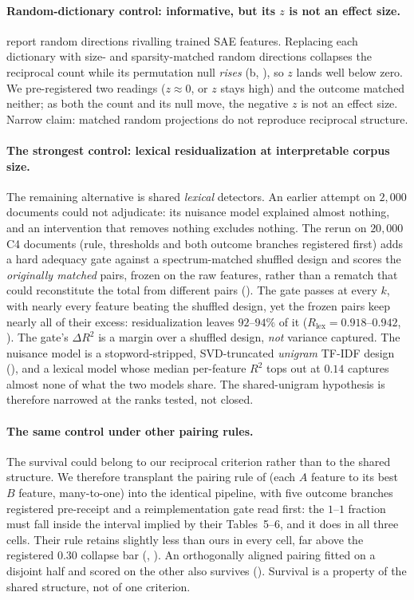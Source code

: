 \paragraph{Random-dictionary control: informative, but its $z$ is not an effect size.}
\citet{korznikov2026sanity} report random directions rivalling trained SAE features. Replacing
each dictionary with size- and sparsity-matched random directions collapses the reciprocal count
while its permutation null \emph{rises} (b, ), so $z$ lands
well below zero. We pre-registered two readings ($z\approx0$, or $z$ stays high) and the
outcome matched neither; as both the count and its null move, the negative $z$ is not an
effect size. Narrow claim: matched random projections do not reproduce reciprocal structure.

\paragraph{The strongest control: lexical residualization at interpretable corpus
size.} The remaining alternative is shared \emph{lexical} detectors. An earlier attempt on
$2{,}000$ documents could not adjudicate: its nuisance model explained almost nothing, and an
intervention that removes nothing excludes nothing. The rerun on $20{,}000$ C4 documents
(rule, thresholds and both outcome branches registered first) adds a hard adequacy gate against a
spectrum-matched shuffled design and scores the \emph{originally matched} pairs, frozen on the raw
features, rather than a rematch that could reconstitute the total from different pairs
(). The gate passes at every $k$, with nearly every feature beating the shuffled design, yet the
frozen pairs keep nearly all of their excess: residualization leaves $92$--$94\%$ of it
($R_{\text{lex}}=0.918$--$0.942$, ). The gate's $\Delta R^2$ is a
margin over a shuffled design, \emph{not} variance captured. The nuisance model is a
stopword-stripped, SVD-truncated \emph{unigram} TF-IDF design (), and a lexical model
whose median per-feature $R^2$ tops out at $0.14$ captures almost none of what the two models
share. The shared-unigram hypothesis is therefore narrowed at the ranks tested, not closed.

\paragraph{The same control under other pairing rules.} The survival could belong to our
reciprocal criterion rather than to the shared structure. We therefore transplant the pairing
rule of \citet{lan2024universal} (each $A$ feature to its best $B$ feature, many-to-one) into the
identical pipeline, with five outcome branches registered pre-receipt and a reimplementation gate
read first: the $1$--$1$ fraction must fall inside the interval implied by their Tables~5--6, and
it does in all three cells. Their rule retains slightly less than ours in every cell, far above the
registered $0.30$ collapse bar (, ). An orthogonally
aligned pairing fitted on a disjoint half and scored on the other also survives
(). Survival is a property of the shared structure, not of one criterion.

